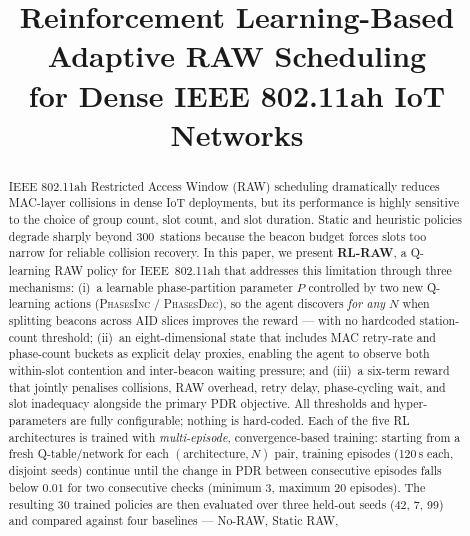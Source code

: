 \documentclass[conference]{IEEEtran}
\begin{document}
\title{Reinforcement Learning-Based Adaptive RAW Scheduling\\
       for Dense IEEE 802.11ah IoT Networks}

\author{
}

\maketitle

\begin{abstract}
IEEE 802.11ah Restricted Access Window (RAW) scheduling dramatically
reduces MAC-layer collisions in dense IoT deployments, but its performance is
highly sensitive to the choice of group count, slot count, and slot duration.
Static and heuristic policies degrade sharply beyond 300~stations because the
beacon budget forces slots too narrow for reliable collision recovery.
In this paper, we present \textbf{RL-RAW}, a Q-learning RAW policy
for IEEE~802.11ah that addresses this limitation through three mechanisms:
(i)~a learnable phase-partition parameter $P$ controlled by two new
Q-learning actions (\textsc{PhasesInc} / \textsc{PhasesDec}), so the agent
discovers \emph{for any} $N$ when splitting beacons across AID slices
improves the reward — with no hardcoded station-count threshold;
(ii)~an eight-dimensional state that includes MAC retry-rate and phase-count
buckets as explicit delay proxies, enabling the agent to observe both
within-slot contention and inter-beacon waiting pressure; and
(iii)~a six-term reward that jointly penalises collisions, RAW overhead,
retry delay, phase-cycling wait, and slot inadequacy alongside the
primary PDR objective.
All thresholds and hyper-parameters are fully configurable; nothing is
hard-coded.
Each of the five RL architectures is trained with \emph{multi-episode},
convergence-based training: starting from a fresh Q-table/network for each
$(\text{architecture}, N)$ pair, training episodes (120\,s each, disjoint
seeds) continue until the change in PDR between consecutive episodes falls
below $0.01$ for two consecutive checks (minimum 3, maximum 20 episodes).
The resulting 30 trained policies are then evaluated over three held-out
seeds (42, 7, 99) and compared against four baselines — No-RAW, Static RAW,

\end{abstract}
\end{document}
